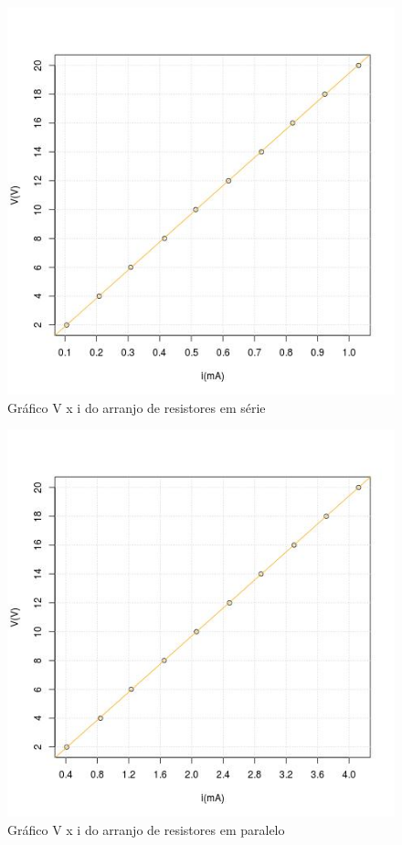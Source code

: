 \documentclass[11pt,a4paper]{article}
\begin{document}
      \begin{figure}[htb!]
        \centering
        \captionsetup{justification=centering}  
        \includegraphics[scale=0.55]{Vis}
        \caption{Gráfico V x i do arranjo de resistores em série}
        \label{fig:is}
      \end{figure}
      
      \begin{figure}[htb!]
        \centering
        \captionsetup{justification=centering}  
        \includegraphics[scale=0.55]{Vip}
        \caption{Gráfico V x i do arranjo de resistores em paralelo}
        \label{fig:ip}
      \end{figure}
      
\end{document}
